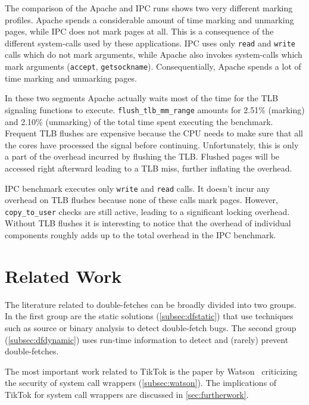 \documentclass[conference]{IEEEtran}
\newcommand{\sysname}{TikTok}
\begin{document}
The comparison of the Apache and IPC runs shows two very different marking
profiles. Apache spends a considerable amount of time marking and unmarking
pages, while IPC does not mark pages at all. This is a consequence of the
different system-calls used by these applications. IPC uses only \texttt{read}
and \texttt{write} calls which do not mark arguments, while Apache also invokes
system-calls which mark arguments (\texttt{accept}, \texttt{getsockname}).
Consequentially, Apache spends a lot of time marking and unmarking pages.

In these two segments Apache actually waits most of the time for the TLB
signaling functions to execute. \texttt{flush\_tlb\_mm\_range} amounts for
2.51\% (marking) and 2.10\% (unmarking) of the total time spent executing the
benchmark. Frequent TLB flushes are expensive because the CPU needs to make sure
that all the cores have processed the signal before continuing. Unfortunately,
this is only a part of the overhead incurred by flushing the TLB. Flushed pages
will be accessed right afterward leading to a TLB miss, further inflating the
overhead.

IPC benchmark executes only \texttt{write} and \texttt{read} calls. It doesn't
incur any overhead on TLB flushes because none of these calls mark pages.
However, \texttt{copy\_to\_user} checks are still
active, leading to a significant locking overhead. Without TLB flushes it is
interesting to notice that the overhead of individual components roughly adds
up to the total overhead in the IPC benchmark.


\section{Related Work}
\label{sec:relatedwork}

The literature related to double-fetches can be broadly divided into two groups.
In the first group are the static solutions (\autoref{subsec:dfstatic}) that use
techniques such as source or binary analysis to detect double-fetch bugs. The
second group (\autoref{subsec:dfdynamic}) uses run-time information to detect
and (rarely) prevent double-fetches.

The most important work related to \sysname{} is the paper by
Watson~\cite{watson2007exploiting} criticizing the security of system call
wrappers (\autoref{subsec:watson}). The implications of \sysname{} for system call
wrappers are discussed in \autoref{sec:furtherwork}.
\end{document}
